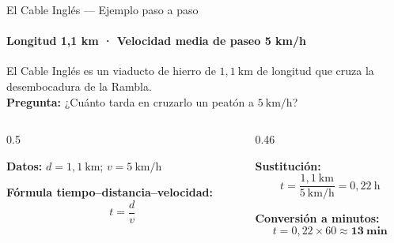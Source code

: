 \documentclass[aspectratio=169, 10pt, spanish]{beamer}
\begin{document}
\begin{frame}{El Cable Inglés — Ejemplo paso a paso}

  \framesubtitle{Longitud 1,1 km · Velocidad media de paseo 5 km/h}
  
        \begin{ejemplobox}
          
          El Cable Inglés es un viaducto de hierro de
          $1{,}1\ \text{km}$ de longitud que cruza la
          desembocadura de la Rambla.\\[4pt]
          \textbf{Pregunta:} ¿Cuánto tarda en cruzarlo
          un peatón a $5\ \text{km/h}$?
        \end{ejemplobox}
  \begin{columns}[c]
    \begin{column}{0.5\textwidth}
      
      \begin{pasobox}[1]
        
        \textbf{Datos:}
        $d = 1{,}1\ \text{km}$;\quad
        $v = 5\ \text{km/h}$
      \end{pasobox}
      
            \begin{pasobox}[2]
              
              \textbf{Fórmula tiempo--distancia--velocidad:}
              \[
                t = \frac{d}{v}
              \]
            \end{pasobox}
    \end{column}
    \begin{column}{0.46\textwidth}
      
      \begin{pasobox}[3]
        
        \textbf{Sustitución:}
        \[
          t = \frac{1{,}1\ \text{km}}{5\ \text{km/h}}
            = 0{,}22\ \text{h}
        \]
      \end{pasobox}
      
      \begin{pasobox}[4]
        
        \textbf{Conversión a minutos:}
        \[
          t = 0{,}22 \times 60 \approx \mathbf{13\ \text{min}}
        \]
      \end{pasobox}
    \end{column}
  \end{columns}
\end{frame}

\end{document}
